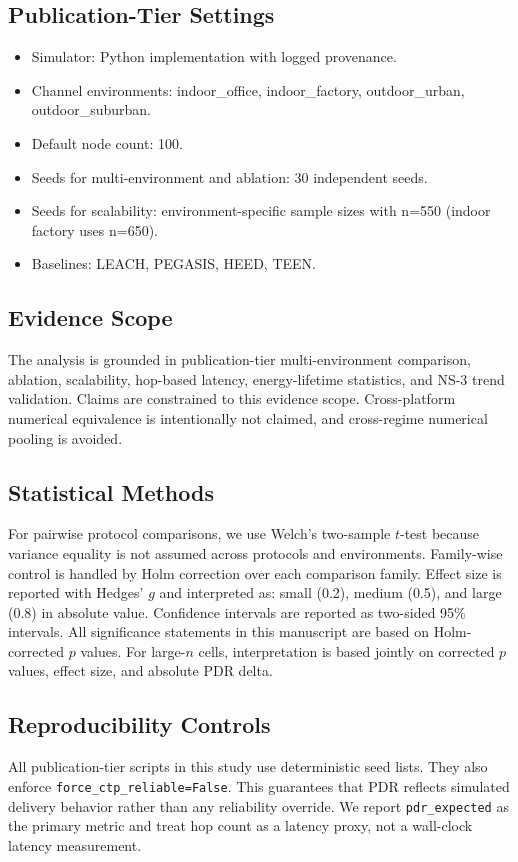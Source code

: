 ﻿\documentclass[sensors,article,submit,moreauthors,pdftex]{Definitions/mdpi}
\begin{document}
\subsection{Publication-Tier Settings}
\begin{itemize}
\item Simulator: Python implementation with logged provenance.
\item Channel environments: indoor\_office, indoor\_factory, outdoor\_urban, outdoor\_suburban.
\item Default node count: 100.
\item Seeds for multi-environment and ablation: 30 independent seeds.
\item Seeds for scalability: environment-specific sample sizes with n=550 (indoor factory uses n=650).
\item Baselines: LEACH, PEGASIS, HEED, TEEN.
\end{itemize}

\subsection{Evidence Scope}
The analysis is grounded in publication-tier multi-environment comparison, ablation, scalability, hop-based latency, energy-lifetime statistics, and NS-3 trend validation. Claims are constrained to this evidence scope. Cross-platform numerical equivalence is intentionally not claimed, and cross-regime numerical pooling is avoided.

\subsection{Statistical Methods}
For pairwise protocol comparisons, we use Welch's two-sample $t$-test because variance equality is not assumed across protocols and environments. Family-wise control is handled by Holm correction over each comparison family. Effect size is reported with Hedges' $g$ and interpreted as: small (0.2), medium (0.5), and large (0.8) in absolute value. Confidence intervals are reported as two-sided 95\% intervals. All significance statements in this manuscript are based on Holm-corrected $p$ values. For large-$n$ cells, interpretation is based jointly on corrected $p$ values, effect size, and absolute PDR delta.

\subsection{Reproducibility Controls}
All publication-tier scripts in this study use deterministic seed lists. They also enforce \texttt{force\_ctp\_reliable=False}. This guarantees that PDR reflects simulated delivery behavior rather than any reliability override. We report \texttt{pdr\_expected} as the primary metric and treat hop count as a latency proxy, not a wall-clock latency measurement.
\end{document}

